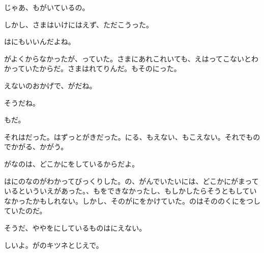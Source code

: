 じゃあ、もがいているの。

しかし、さまはいけにはえず、ただこうった。

はにもいいんだよね。

がよくからなかったが、っていた。さまにあれこれいても、えはってこないとわかっていたからだ。さまはれてりんだ。もそのにった。

えないのおかげで、がだね。

そうだね。

もだ。

それはだった。はずっとがきだった。にる、もえない、もこえない。それでものでかがる、かがう。

がなのは、どこかにをしているからだよ。

はにのなのがわかってびっくりした。の、がんでいたいには、どこかにがまっているといういえがあった。、もをできなかったし、もしかしたらそうともしていなかったかもしれない。しかし、そのがにをかけていた。のはそののくにをつしていたのだ。

そうだ、ややをにしているものはにえない。

しいよ。がのキツネとじえで。

